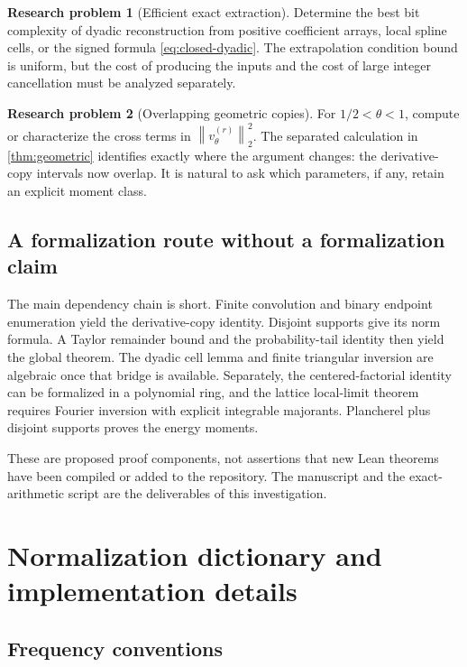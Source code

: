 \documentclass[11pt,a4paper]{article}
\numberwithin{equation}{section}
\theoremstyle{definition}
\newtheorem{problem}[problem]{Research problem}
\newcommand{\norm}[1]{\left\lVert #1\right\rVert}
\begin{document}
\begin{problem}[Efficient exact extraction]
Determine the best bit complexity of dyadic reconstruction from
positive coefficient arrays, local spline cells, or the signed
formula \eqref{eq:closed-dyadic}. The extrapolation condition bound
is uniform, but the cost of producing the inputs and the cost of
large integer cancellation must be analyzed separately.
\end{problem}

\begin{problem}[Overlapping geometric copies]
For $1/2<\theta<1$, compute or characterize the cross terms in
$\norm{v_\theta^{(r)}}_2^2$. The separated calculation in
\cref{thm:geometric} identifies exactly where the argument changes:
the derivative-copy intervals now overlap. It is natural to ask
which parameters, if any, retain an explicit moment class.
\end{problem}

\subsection{A formalization route without a formalization claim}

The main dependency chain is short. Finite convolution and binary
endpoint enumeration yield the derivative-copy identity. Disjoint
supports give its norm formula. A Taylor remainder bound and the
probability-tail identity then yield the global theorem. The
dyadic cell lemma and finite triangular inversion are algebraic
once that bridge is available. Separately, the centered-factorial
identity can be formalized in a polynomial ring, and the lattice
local-limit theorem requires Fourier inversion with explicit
integrable majorants. Plancherel plus disjoint supports proves
the energy moments.

These are proposed proof components, not assertions that new Lean
theorems have been compiled or added to the repository. The
manuscript and the exact-arithmetic script are the deliverables
of this investigation.

\appendix
\section{Normalization dictionary and implementation details}\label{app:normalization}

\subsection{Frequency conventions}
\end{document}
